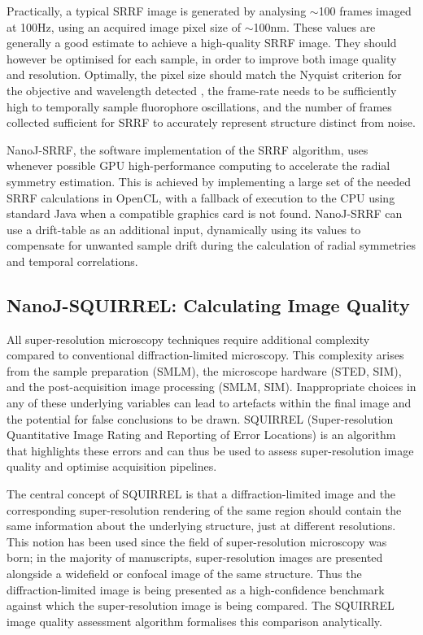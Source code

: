  Practically, a typical SRRF image is generated by analysing $\sim$100 frames imaged at 100Hz, using an acquired image pixel size of $\sim$100nm. These values are generally a good estimate to achieve a high-quality SRRF image. They should however be optimised for each sample, in order to improve both image quality and resolution. Optimally, the pixel size should match the Nyquist criterion for the objective and wavelength detected \cite{pawley2010handbook}, the frame-rate needs to be sufficiently high to temporally sample fluorophore oscillations, and the number of frames collected sufficient for SRRF to accurately represent structure distinct from noise. 
 
 NanoJ-SRRF, the software implementation of the SRRF algorithm, uses whenever possible GPU high-performance computing to accelerate the radial symmetry estimation. This is achieved by implementing a large set of the needed SRRF calculations in OpenCL, with a fallback of execution to the CPU using standard Java when a compatible graphics card is not found. NanoJ-SRRF can use a drift-table as an additional input, dynamically using its values to compensate for unwanted sample drift during the calculation of radial symmetries and temporal correlations.

\subsection*{NanoJ-SQUIRREL: Calculating Image Quality}
All super-resolution microscopy techniques require additional complexity compared to conventional diffraction-limited microscopy. This complexity arises from the sample preparation (SMLM), the microscope hardware (STED, SIM), and the post-acquisition image processing (SMLM, SIM). Inappropriate choices in any of these underlying variables can lead to artefacts within the final image and the potential for false conclusions to be drawn. SQUIRREL (Super-resolution Quantitative Image Rating and Reporting of Error Locations) is an algorithm that highlights these errors and can thus be used to assess super-resolution image quality and optimise acquisition pipelines.

The central concept of SQUIRREL is that a diffraction-limited image and the corresponding super-resolution rendering of the same region should contain the same information about the underlying structure, just at different resolutions. This notion has been used since the field of super-resolution microscopy was born; in the majority of manuscripts, super-resolution images are presented alongside a widefield or confocal image of the same structure. Thus the diffraction-limited image is being presented as a high-confidence benchmark against which the super-resolution image is being compared. The SQUIRREL image quality assessment algorithm formalises this comparison analytically.

